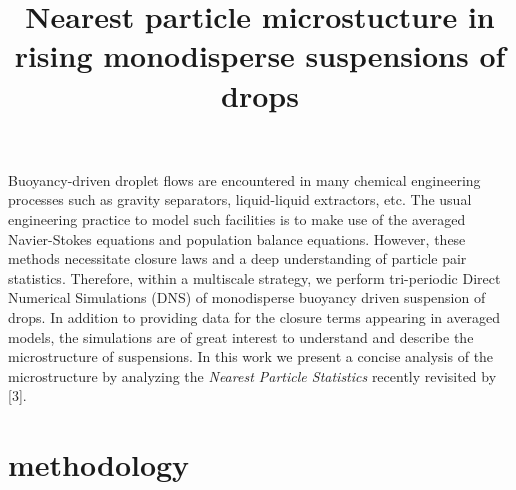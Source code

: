 \documentclass[9pt,a4paper]{article}
\begin{document}
\title{Nearest particle microstucture in rising monodisperse suspensions of drops}
%
%

%

\maketitle


\begin{summary}
    Buoyancy-driven droplet flows are encountered in many chemical engineering processes such as gravity separators, liquid-liquid extractors, etc. The usual engineering practice to model such facilities is to make use of the averaged Navier-Stokes equations and population balance equations. 
    However, these methods necessitate closure laws and a deep understanding of particle pair statistics.
    Therefore, within a multiscale strategy, we perform tri-periodic Direct Numerical Simulations (DNS) of monodisperse buoyancy driven suspension of drops.
    In addition to providing data for the closure terms appearing in averaged models, the simulations are of great interest to understand and describe the microstructure of suspensions. 
    In this work we present a concise analysis of the microstructure by analyzing the \textit{Nearest Particle Statistics} recently revisited by [3].  %
\end{summary}

\section*{methodology}
\setlength{\parindent}{10pt}
\vspace*{-10pt}
\end{document}
